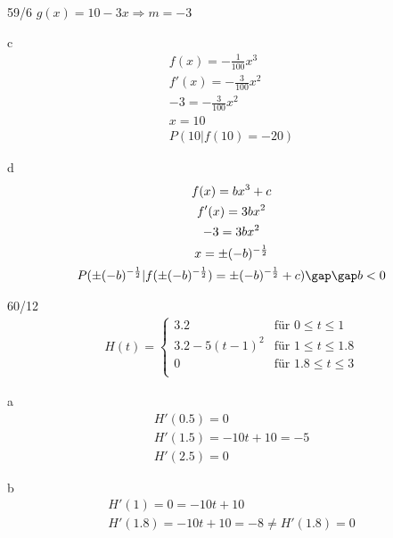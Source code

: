 \newpage
\begin{exercise}{59/6}
  $g(x) = 10 - 3x \Rightarrow m = -3$
  \item [c]
  \begin{gather*}
    f(x) = -\frac{1}{100}x^3 \\
    f'(x) = -\frac{3}{100}x^2 \\
    -3 = -\frac{3}{100}x^2 \\
    x = 10 \\
    P(10 | f(10) = -20)
  \end{gather*}
  \item [d]
  \begin{gather*}
    f(x) = bx^3 + c \\
    f'(x) = 3bx^2 \\
    -3 = 3bx^2 \\
    x = \pm (-b)^{-\frac{1}{2}} \\
    P(\pm (-b)^{-\frac{1}{2}} | f(\pm (-b)^{-\frac{1}{2}}) = \pm (-b)^{-\frac{1}{2}}+ c) \gap\gap b < 0
  \end{gather*}
\end{exercise}
\begin{exercise}{60/12}
  \begin{gather*}
    H(t) =
    \begin{cases}
      3.2 & \text{für } 0 \leq t \leq 1 \\
      3.2 - 5(t - 1)^2 & \text{für } 1 \leq t \leq 1.8 \\
      0 & \text{für } 1.8 \leq t \leq 3 \\
    \end{cases}
  \end{gather*}
  \item [a]
  \begin{gather*}
    H'(0.5) = 0 \\
    H'(1.5) = -10t + 10 = -5 \\
    H'(2.5) = 0
  \end{gather*}
  \item [b]
  \begin{gather*}
    H'(1) = 0 = -10t + 10 \\
    H'(1.8) = -10t + 10 = -8 \neq H'(1.8) = 0
  \end{gather*}
\end{exercise}
\newpage
